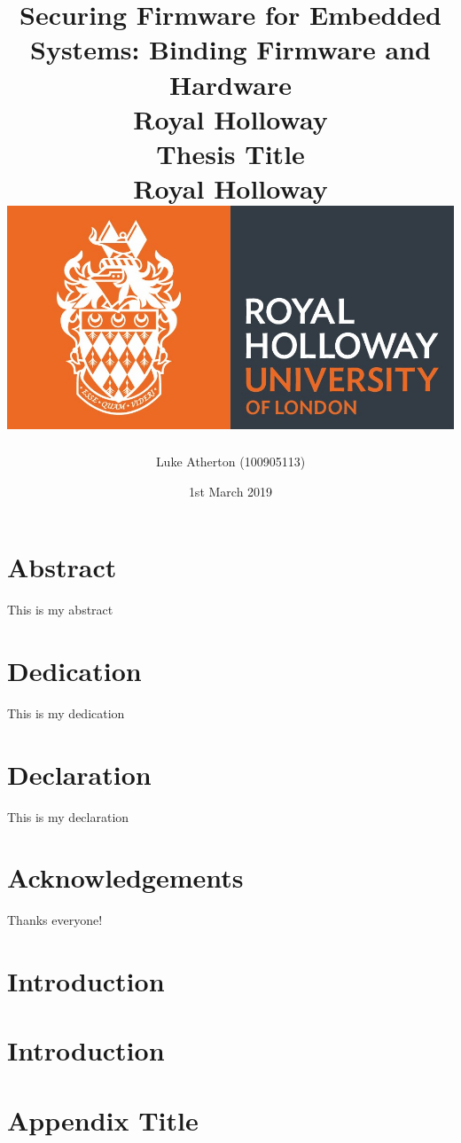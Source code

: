 \documentclass[10pt]{report}
\title{
	{Securing Firmware for Embedded Systems: Binding Firmware and Hardware}\\
	{\large Royal Holloway}\\
}
\title{
	{Thesis Title}\\
	{\large Royal Holloway}\\
	{\includegraphics[scale=0.5]{royalholloway.jpg}}
}
\author{Luke Atherton (100905113)}
\date{1st March 2019}
\newif\iflitreview
\begin{document}
\maketitle

\iflitreview

\else

\chapter*{Abstract}
This is my abstract

\chapter*{Dedication}
This is my dedication

\chapter*{Declaration}
This is my declaration

\chapter*{Acknowledgements}
Thanks everyone!

\fi

\tableofcontents

\iflitreview

\chapter{Literature Review}

\else

\chapter{Introduction}


\chapter{Introduction}


\appendix
\chapter{Appendix Title}


\fi
\begin{sloppypar}
\printbibliography
\end{sloppypar}
\end{document}
